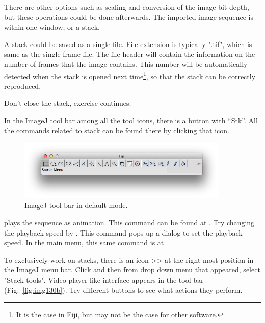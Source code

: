 \begin{indentexercise}{1}
There are other options such as scaling and conversion of the image bit depth,
but these operations could be done afterwards. The imported image sequence is within one window, or a stack.

A stack could be saved as a single file. File extension is
typically ".tif", which is same as the single frame file. The file header will contain the
information on the number of frames that the image contains. This number
will be automatically detected when the stack is opened next time\footnote{It is the case in Fiji, but may not be the case for other software.}, so that the stack can be correctly reproduced. 
\end{indentexercise}

Don't close the stack, exercise continues. 

\begin{indentexercise}{2}

In the ImageJ tool bar among all the tool icons, there is a button with ``Stk''. All the commands related to stack can be found there by clicking that icon. 

\begin{figure}[htbp]
\begin{center}
\includegraphics[width=0.9\textwidth]{fig/fijiMenu.png}
\caption{ ImageJ tool bar in default mode.}
\label{fig:img130a}
\end{center}
\end{figure}

 plays the sequence as animation. This command can be found at . 
Try changing the playback speed by . This command pops up a dialog to set the playback speed. In the main menu, this same command is at  

To exclusively work on stacks, there is an icon >> at the right most position in the ImageJ menu bar. Click and then from drop down menu that appeared, select "Stack tools". Video player-like interface appears in the tool bar (Fig.~\ref{fig:img130b}). Try different buttons to see what actions they perform. 


\end{indentexercise}

